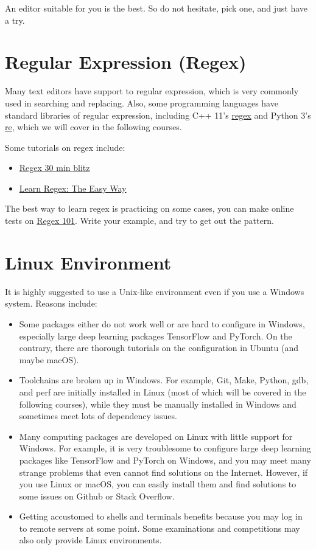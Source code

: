 \documentclass[english]{../TexTemplate/thesis}
\begin{document}
An editor suitable for you is the best.
So do not hesitate, pick one, and just have a try.

\section{Regular Expression (Regex)}
Many text editors have support to regular expression, which is very commonly used in searching and replacing.
Also, some programming languages have standard libraries of regular expression, including C++ 11's \href{http://www.cplusplus.com/reference/regex/}{regex} and Python 3's \href{https://docs.python.org/zh-cn/3.6/library/re.html}{re}, which we will cover in the following courses.

Some tutorials on regex include:
\begin{itemize}
	\item \href{https://deerchao.cn/tutorials/regex/regex.htm}{Regex 30 min blitz}
	\item \href{https://github.com/ziishaned/learn-regex}{Learn Regex: The Easy Way}
\end{itemize}

The best way to learn regex is practicing on some cases, you can make online tests on \href{https://regex101.com}{Regex 101}.
Write your example, and try to get out the pattern.

\section{Linux Environment}
It is highly suggested to use a Unix-like environment even if you use a Windows system.
Reasons include:
\begin{itemize}
	\item Some packages either do not work well or are hard to configure in Windows, especially large deep learning packages TensorFlow and PyTorch. On the contrary, there are thorough tutorials on the configuration in Ubuntu (and maybe macOS).
	\item Toolchains are broken up in Windows.
	For example, Git, Make, Python, gdb, and perf are initially installed in Linux (most of which will be covered in the following courses), while they must be manually installed in Windows and sometimes meet lots of dependency issues.
	\item Many computing packages are developed on Linux with little support for Windows.
	For example, it is very troublesome to configure large deep learning packages like TensorFlow and PyTorch on Windows, and you may meet many strange problems that even cannot find solutions on the Internet.
	However, if you use Linux or macOS, you can easily install them and find solutions to some issues on Github or Stack Overflow.
	\item Getting accustomed to shells and terminals benefits because you may log in to remote servers at some point.
	Some examinations and competitions may also only provide Linux environments.
\end{itemize}
\end{document}
